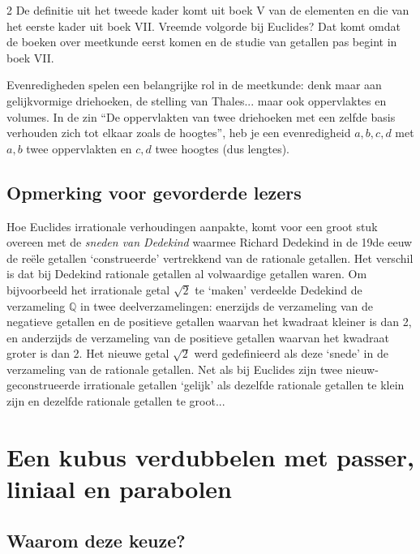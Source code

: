 \begin{multicols}{2}
	De definitie uit het tweede kader komt uit boek V van de elementen en die van het eerste kader uit boek VII. Vreemde volgorde bij Euclides? Dat komt omdat de boeken over meetkunde eerst komen en de studie van getallen pas begint in boek VII.
	
	Evenredigheden spelen een belangrijke rol in de meetkunde: denk maar aan gelijkvormige driehoeken, de stelling van Thales... maar ook oppervlaktes en volumes. In de zin ``De oppervlakten van twee driehoeken met een zelfde basis verhouden zich tot elkaar zoals de hoogtes'', heb je een evenredigheid $a, b, c, d$ met $a, b$ twee oppervlakten en $c, d$ twee hoogtes (dus lengtes). 
	
	\subsection*{Opmerking voor gevorderde lezers}
	
	Hoe Euclides irrationale verhoudingen aanpakte, komt voor een groot stuk overeen met de \emph{sneden van Dedekind} waarmee Richard Dedekind in de 19de eeuw de reële getallen `construeerde' vertrekkend van de rationale getallen. Het verschil is dat bij Dedekind rationale getallen al volwaardige getallen waren. Om bijvoorbeeld het irrationale getal $\sqrt{2}$ te `maken' verdeelde Dedekind de verzameling $\mathbb{Q}$ in twee deelverzamelingen: enerzijds de verzameling van de negatieve getallen en de positieve getallen waarvan het kwadraat kleiner is dan 2, en anderzijds de verzameling van de positieve getallen waarvan het kwadraat groter is dan 2. Het nieuwe getal $\sqrt{2}$ werd gedefinieerd als deze `snede' in de verzameling van de rationale getallen. Net als bij Euclides zijn twee nieuw-geconstrueerde irrationale getallen `gelijk' als dezelfde rationale getallen te klein zijn en dezelfde rationale getallen te groot...
	
	\section{Een kubus verdubbelen met passer, liniaal en parabolen}
	
	\subsection*{Waarom deze keuze?}
	

\end{multicols}

